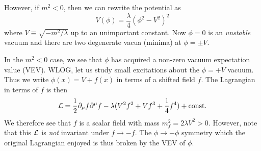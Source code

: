 However, if $m^2 <0$, then we can rewrite the potential as
\begin{equation}
    V(\phi)=\frac{\lambda}{4}(\phi^2-V^2)^2
\end{equation}
where $V\equiv \sqrt{-m^2/\lambda}$ up to an unimportant constant. Now $\phi=0$ is an \emph{unstable} vacuum and there are two degenerate vacua (minima) at $\phi=\pm V$.

In the $m^2 <0$ case, we see that $\phi$ has acquired a non-zero vacuum expectation value (VEV). WLOG, let us study small excitations about the $\phi=+V$ vacuum. Thus we write $\phi(x)=V+f(x)$ in terms of a shifted field $f$. The Lagrangian in terms of $f$ is then
\begin{equation}
    \mathcal L = \frac{1}{2} \partial_\mu f \partial^\mu f - \lambda (V^2 f^2+Vf^3 +\frac{1}{4} f^4)+\text{const}.
\end{equation}
We therefore see that $f$ is a scalar field with mass $m_f^2 = 2\lambda V^2 >0$. However, note that this $\mathcal L$ is \emph{not} invariant under $f\to -f$. The $\phi\to -\phi$ symmetry which the original Lagrangian enjoyed is thus broken by the VEV of $\phi$.